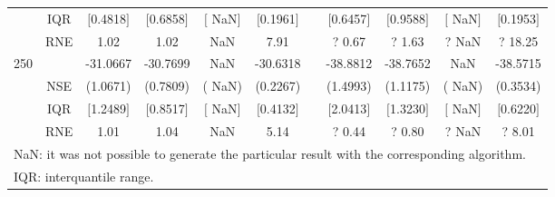 {{\begin{longtable}{ccccccccccc}
 & IQR & $[$0.4818$]$ & $[$0.6858$]$ & $[$   NaN$]$ & $[$0.1961$]$ & & $[$0.6457$]$ & $[$0.9588$]$  &$[$   NaN$]$ & $[$0.1953$]$  \\  
  & RNE &   1.02 &   1.02 &    NaN &   7.91 &  &?   0.67 & ?   1.63 &  ?    NaN & ?  18.25   \\ [1ex] 
250 & & -31.0667 & -30.7699 &    NaN & -30.6318 & & -38.8812 & -38.7652 &    NaN & -38.5715  \\ 
  & NSE & (1.0671) & (0.7809) & (   NaN) & (0.2267) & & (1.4993) & (1.1175) & (   NaN) & (0.3534)   \\ 
 & IQR & $[$1.2489$]$ & $[$0.8517$]$ & $[$   NaN$]$ & $[$0.4132$]$ & & $[$2.0413$]$ & $[$1.3230$]$  &$[$   NaN$]$ & $[$0.6220$]$  \\  
  & RNE &   1.01 &   1.04 &    NaN &   5.14 &  &?   0.44 & ?   0.80 &  ?    NaN & ?   8.01   \\ [1ex] 
\hline 
  \multicolumn{11}{l}{\footnotesize{NaN: it was not possible to generate the particular result with the corresponding algorithm.}} \\ 
  \multicolumn{11}{l}{\footnotesize{IQR: interquantile range.}} \\ 
\end{longtable} 
} 
} 
